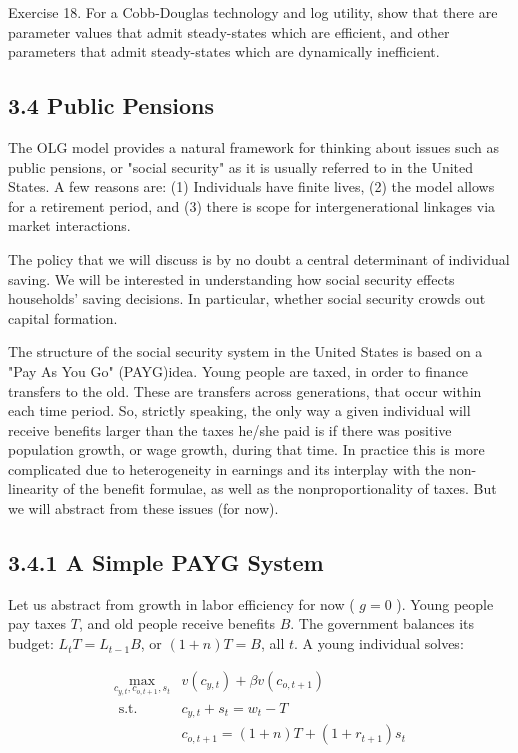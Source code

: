 \documentclass[10pt]{article}
\begin{document}
Exercise 18. For a Cobb-Douglas technology and log utility, show that there are parameter values that admit steady-states which are efficient, and other parameters that admit steady-states which are dynamically inefficient.

\subsection*{3.4 Public Pensions}
The OLG model provides a natural framework for thinking about issues such as public pensions, or "social security" as it is usually referred to in the United States. A few reasons are: (1) Individuals have finite lives, (2) the model allows for a retirement period, and (3) there is scope for intergenerational linkages via market interactions.

The policy that we will discuss is by no doubt a central determinant of individual saving. We will be interested in understanding how social security effects households' saving decisions. In particular, whether social security crowds out capital formation.

The structure of the social security system in the United States is based on a "Pay As You Go" (PAYG)idea. Young people are taxed, in order to finance transfers to the old. These are transfers across generations, that occur within each time period. So, strictly speaking, the only way a given individual will receive benefits larger than the taxes he/she paid is if there was positive population growth, or wage growth, during that time. In practice this is more complicated due to heterogeneity in earnings and its interplay with the non-linearity of the benefit formulae, as well as the nonproportionality of taxes. But we will abstract from these issues (for now).

\subsection*{3.4.1 A Simple PAYG System}
Let us abstract from growth in labor efficiency for now ( $g=0$ ). Young people pay taxes $T$, and old people receive benefits $B$. The government balances its budget: $L_{t} T=L_{t-1} B$, or $(1+n) T=B$, all $t$. A young individual solves:

$$
\begin{array}{rl}
\max _{c_{y, t}, c_{o, t+1}, s_{t}} & v\left(c_{y, t}\right)+\beta v\left(c_{o, t+1}\right) \\
\text { s.t. } & c_{y, t}+s_{t}=w_{t}-T \\
& c_{o, t+1}=(1+n) T+\left(1+r_{t+1}\right) s_{t}
\end{array}
$$
\end{document}
